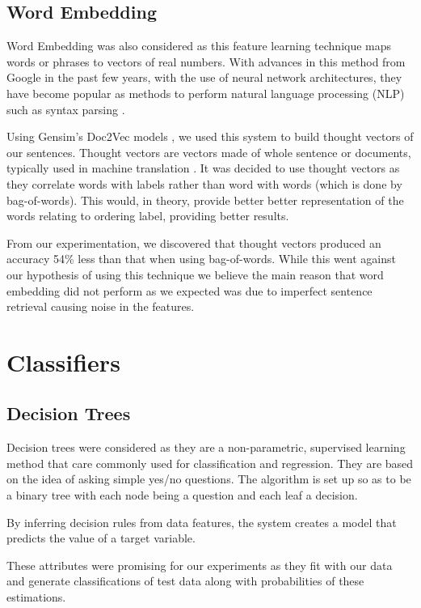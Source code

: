 \documentclass[bsc,frontabs,twoside,singlespacing,parskip,deptreport]{infthesis}     %
\begin{document}
\subsection{Word Embedding} \label{sec:word-embedding}
Word Embedding was also considered as this feature learning technique maps words or phrases to vectors of real numbers.
With advances in this method from Google in the past few years, with the use of neural network architectures, they have become
popular as methods to perform natural language processing (NLP) such as syntax parsing \cite{socher2013parsing}.

Using Gensim's Doc2Vec models \cite{rehurek_lrec}, we used this system to build thought vectors of our sentences.
Thought vectors are vectors made of whole sentence or documents, typically used in machine translation \cite{deeplearning4j}.
It was decided to use thought vectors as they correlate words with labels rather than word with words (which is done by bag-of-words).
This would, in theory, provide better better representation of the words relating to ordering label, providing better results.



From our experimentation, we discovered that thought vectors produced an accuracy 54\% less than that when
using bag-of-words. While this went against our hypothesis of using this technique we believe
the main reason that word embedding did not perform as we expected was due to imperfect sentence retrieval causing noise in
the features.

\section{Classifiers}\label{sec:classifiers}
\subsection{Decision Trees}
Decision trees were considered as they are a non-parametric, supervised learning method that care commonly used for
classification and regression.
They are based on the idea of asking simple yes/no questions. The algorithm is set up so as to be a binary tree with
each node being a question and each leaf a decision.

By inferring decision rules from data features, the system creates a model that predicts the value of a target variable.

These attributes were promising for our experiments as they fit with our data and generate
classifications of test data along with probabilities of these estimations.
\end{document}
